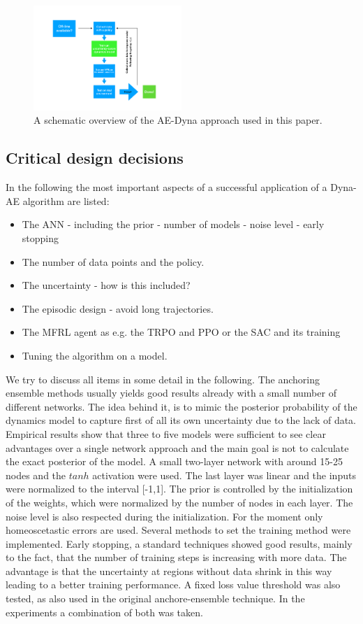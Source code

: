 \documentclass[
 reprint,
 amsmath,amssymb,amsfonts,clevref,
 aps,
prstab,
]{revtex4-2}
\begin{document}
\begin{figure}[!h]
	\centering
	\includegraphics*[width=0.5\textwidth]{Figures/MBRL_overview}
	\caption{A schematic overview of the AE-Dyna approach used in this paper.}
	\label{fig:MBRL_overview}
\end{figure}
\subsection{Critical design decisions}\label{ss:critical_design}
In the following the most important aspects of a successful application of a Dyna-AE algorithm are listed:
\begin{itemize}
	\item The ANN - including the prior - number of models - noise level - early stopping
	\item The number of data points and the policy.
	\item The uncertainty - how is this included?
	\item The episodic design - avoid long trajectories.
	\item The MFRL agent as e.g. the TRPO and PPO or the SAC and its training
	\item Tuning the algorithm on a model.
\end{itemize}
We try to discuss all items in some detail in the following.
The anchoring ensemble methods usually yields good results already with a small number of different networks. The idea behind it, is to mimic the posterior probability of the dynamics model to capture first of all its own uncertainty due to the lack of data. Empirical results show that three to five models were sufficient to see clear advantages over a single network approach and the main goal is not to calculate the exact posterior of the model. A small two-layer network with around 15-25 nodes and the $tanh$ activation were used. The last layer was linear and the inputs were normalized to the interval [-1,1]. The prior is controlled by the initialization of the weights, which were normalized by the number of nodes in each layer. The noise level is also respected during the initialization. For the moment only homeoscetastic errors are used. Several methods to set the training method were implemented. Early stopping, a standard techniques showed good results, mainly to the fact, that the number of training steps is increasing with more data. The advantage is that the uncertainty at regions without data shrink in this way leading to a better training performance. A fixed loss value threshold was also tested, as also used in the original anchore-ensemble technique. In the experiments a combination of both was taken.\\
\end{document}
